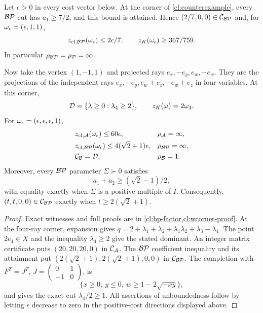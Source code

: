 \begin{theorem}\label{cl:unbounded}
Let $\epsilon>0$ in every cost vector below.
At the corner of \cref{cl:counterexample}, every $\mathcal {BP}$ cut has
$a_1\ge7/2$, and this bound is attained. Hence
$(2/7,0,0)\in\mathcal C_{\mathcal {BP}}$ and, for $\omega_\epsilon=(\epsilon,1,1)$,
\[
 z_{\mathrm{cl},\mathcal {BP}}(\omega_\epsilon)\le2\epsilon/7,
 \qquad z_K(\omega_\epsilon)\ge367/759.
\]
In particular $\rho_{\mathcal {BP}}=\rho_{\mathcal P}=\infty$.

Now take the vertex $(1,-1,1)$ and projected rays
$e_x,-e_y,e_w,-e_w$. They are the projections of the independent rays
$e_x,-e_y,e_w+e_z,-e_w+e_z$ in four variables. At this corner,
\[
 \mathcal D=\{\lambda\ge0:\lambda_4\ge2\},\qquad
 z_K(\omega)=2\omega_4.
\]
For $\omega_\epsilon=(\epsilon,\epsilon,\epsilon,1)$,
\begin{align*}
 &z_{\mathrm{cl},\mathcal A}(\omega_\epsilon)\le60\epsilon,
 &&\rho_{\mathcal A}=\infty,\\
 &z_{\mathrm{cl},\mathcal {BP}}(\omega_\epsilon)\le4(\sqrt2+1)\epsilon,
 &&\rho_{\mathcal {BP}}=\infty,\\
 &\mathcal C_{\mathcal B}=\mathcal D,
 &&\rho_{\mathcal B}=1.
\end{align*}
Moreover, every $\mathcal {BP}$ parameter $\Sigma\succ0$ satisfies
\[
 a_1+a_2\ge(\sqrt2-1)/2,
\]
with equality exactly when $\Sigma$ is a positive multiple of $I$.
Consequently,
$(t,t,0,0)\in\mathcal C_{\mathcal {BP}}$ exactly when $t\ge2(\sqrt2+1)$.
\end{theorem}

\begin{proof}
Exact witnesses and full proofs are in
\cref{cl:bp-factor,cl:wcorner-proof}.
At the four-ray corner, expansion gives
$q=2+\lambda_1+\lambda_2+\lambda_1\lambda_2+\lambda_3-\lambda_4$.
The point $2e_4\in X$ and the inequality $\lambda_4\ge2$ give the stated
dominant. An integer matrix certificate puts $(20,20,20,0)$ in
$\mathcal C_{\mathcal A}$. The $\mathcal {BP}$ coefficient inequality and its
attainment put $(2(\sqrt2+1),2(\sqrt2+1),0,0)$ in
$\mathcal C_{\mathcal {BP}}$. The completion with $F^T=J^T$,
$J=\left(\begin{smallmatrix}0&1\\-1&0\end{smallmatrix}\right)$, is
\[
 \{x\ge0,\ y\le0,\ w\ge1-2\sqrt{-xy}\},
\]
and gives the exact cut $\lambda_4/2\ge1$.
All assertions of unboundedness follow by letting $\epsilon$ decrease
to zero in the positive-cost directions displayed above.
\end{proof}

